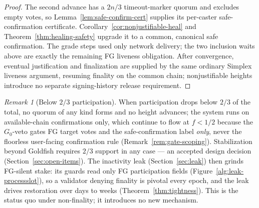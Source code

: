 \ifx\litemode\undefined\documentclass{article}\fi
\newcommand{\Gzero}{\ensuremath{G_{0}}}
\theoremstyle{plain}
\theoremstyle{definition}
\theoremstyle{remark}
\newtheorem{remark}[theorem]{Remark}
\begin{document}
\begin{proof}
The second advance has a \(2n/3\) timeout-marker quorum and excludes empty votes,
so Lemma~\ref{lem:safe-confirm-cert} supplies its per-caster safe-confirmation
certificate.  Corollary~\ref{cor:nonjustifiable-heal} and
Theorem~\ref{thm:healing-safety} upgrade it to a common, canonical safe
confirmation.  The grade steps used only network delivery;
the two inclusion waits above are exactly the remaining FG liveness obligation.
After convergence, eventual justification and finalization are supplied by the
same ordinary Simplex liveness argument, resuming finality on the common chain;
nonjustifiable heights introduce no separate signing-history release
requirement.
\end{proof}

\begin{remark}[Below \(2/3\) participation]\label{rem:sub-two-thirds}
When participation drops below \(2/3\) of the total, no quorum of any kind forms
and no height advances; the system runs on available-chain confirmations only,
which continue to flow at \(f < 1/2\) because the \(\Gzero\)-veto gates FG target
votes and the safe-confirmation label \emph{only}, never the floorless user-facing
confirmation rule (Remark~\ref{rem:gate-scoping}).  Stabilization beyond Goldfish
requires \(2/3\) support in any case --- an accepted design decision
(Section~\ref{sec:open-items}).  The inactivity leak (Section~\ref{sec:leak}) then
grinds FG-silent stake: its guards read only FG participation fields
(Figure~\ref{alg:leak-processslot}), so a validator denying finality is pivotal
every epoch, and the leak drives restoration over days to weeks
(Theorem~\ref{thm:tightness}).  This is the status quo under non-finality; it
introduces no new mechanism.
\end{remark}
\end{document}

